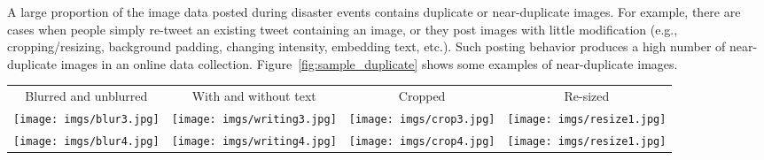 \documentclass{iscram}
\begin{document}
A large proportion of the image data posted during disaster events contains duplicate or near-duplicate images. For example, there are cases when people simply re-tweet an existing tweet containing an image, or they post images with little modification (e.g., cropping/resizing, background padding, changing intensity, embedding text, etc.). Such posting behavior produces a high number of near-duplicate images in an online data collection. Figure~\ref{fig:sample_duplicate} shows some examples of near-duplicate images.

\begin{figure*}[ht!]
\centering
\begin{tabular}{c c c c }
  		Blurred and unblurred & With and without text & Cropped  & Re-sized  \\
\texttt{[image: imgs/blur3.jpg]} 
&\texttt{[image: imgs/writing3.jpg]}
&\texttt{[image: imgs/crop3.jpg]}
&\texttt{[image: imgs/resize1.jpg]}\\
\texttt{[image: imgs/blur4.jpg]} 
&\texttt{[image: imgs/writing4.jpg]}
&\texttt{[image: imgs/crop4.jpg]}
&\texttt{[image: imgs/resize1.jpg]}\\
\end{tabular}
\caption{Examples of near-duplicate images found in our datasets.}
\label{fig:sample_duplicate}
\end{figure*}
\end{document}
